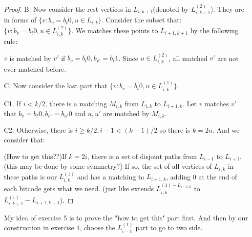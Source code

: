 \begin{proof}
        B. Now consider the rest vertices in $L_{i,k+1}$(denoted by $L_{i,k+1}^{(2)}$). 
        They are in forms of $\{v:b_v=\overline{b_t0},u\in L_{i,k}\}$. Consider the subset that: 
        $\{v:b_v=\overline{b_t0},u\in L_{i,k}^{(2)}\}$. We matches these points to $L_{i+1,k+1}$ by the following rule: 
        
        $v$ is matched by $v'$ if $b_v=\overline{b_t0},b_{v'}=\overline{b_t1}$. Since $u\in L_{i,k}^{(2)}$, 
        all matched $v'$ are not ever matched before. 

        C. Now consider the last part that $\{v:b_v=\overline{b_t0},u\in L_{i,k}^{(1)}\}$. 
        
        C1. If $i<k/2$, there is a matching $M_{i,k}$ from $L_{i,k}$ to $L_{i+1,k}$. 
        Let $v$ matches $v'$ that $b_v=\overline{b_t0},b_{v'}=\overline{b_{u'}0}$ and $u,u'$ are matched by $M_{i,k}$. 

        C2. Otherwise, there is $i\geq k/2,i-1<(k+1)/2$ so there is $k=2u$. And we consider that: 
        
        (How to get this??)If $k=2i$, there is a set of disjoint paths from $L_{i-1}$ to $L_{i+1}$.(this may be done by some symmetry?) 
        If so, the set of all vertices of $L_{i,k}$ in these paths is our $L_{i,k}^{(1)}$ 
        and has a matching to $L_{i+1,k}$, adding 0 at the end of each bitcode gets what we need. 
        (just like extends $L_{i,k}^{(1)-L_{i+1,k}}$ to $L_{i,k+1}^{(1)}-L_{i+1,k+1}$).
    \end{proof} 

    My idea of exercise 5 is to prove the "how to get this" part first. 
    And then by our construction in exercise 4, choose the $L_{i-1}^{(1)}$ part to go to two side. 




